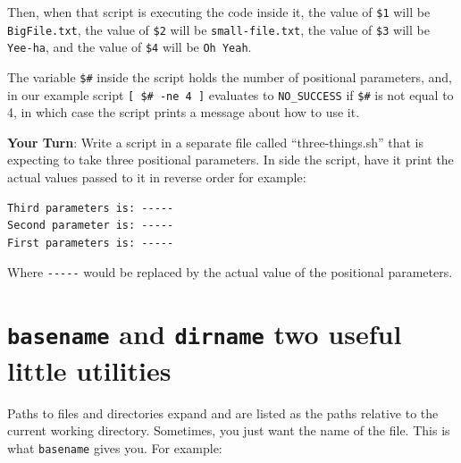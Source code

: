 \documentclass[]{krantz}
\begin{document}
Then, when that script is executing the code inside it, the value of
\texttt{\$1} will be \texttt{BigFile.txt}, the value of \texttt{\$2} will be \texttt{small-file.txt}, the
value of \texttt{\$3} will be \texttt{Yee-ha}, and the value of \texttt{\$4} will be \texttt{Oh\ Yeah}.

The variable \texttt{\$\#} inside the script holds the number of positional parameters, and,
in our example script \texttt{{[}\ \$\#\ -ne\ 4\ {]}} evaluates to \texttt{NO\_SUCCESS} if \texttt{\$\#} is not equal
to 4, in which case the script prints a message about how to use it.

\textbf{Your Turn}: Write a script in a separate file called ``three-things.sh'' that is
expecting to take three positional parameters. In side the script, have it print
the actual values passed to it in reverse order for example:

\begin{verbatim}
Third parameters is: -----
Second parameter is: -----
First parameters is: -----
\end{verbatim}

Where \texttt{-\/-\/-\/-\/-} would be replaced by the actual value of the positional parameters.

\hypertarget{basename-and-dirname-two-useful-little-utilities}{%
\section{\texorpdfstring{\texttt{basename} and \texttt{dirname} two useful little utilities}{basename and dirname two useful little utilities}}\label{basename-and-dirname-two-useful-little-utilities}}

Paths to files and directories expand and are listed as the paths relative
to the current working directory. Sometimes, you just want the name of the
file. This is what \texttt{basename} gives you. For example:
\end{document}
